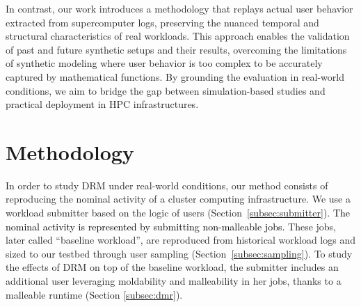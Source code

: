 \documentclass[a4paper,fleqn]{cas-dc}
\newcommand{\sergio}[1]{\textcolor{black}{#1}}
\begin{document}
In contrast, our work introduces a methodology that replays actual user behavior extracted from supercomputer logs, preserving the nuanced temporal and structural characteristics of real workloads. This approach enables the validation of past and future synthetic setups and their results, overcoming the limitations of synthetic modeling where user behavior is too complex to be accurately captured by mathematical functions. By grounding the evaluation in real-world conditions, we aim to bridge the gap between simulation-based studies and practical deployment in HPC infrastructures.



\section{Methodology}\label{sec:methodology}

In order to study DRM under real-world conditions,
our method consists of reproducing the nominal activity of a cluster computing infrastructure.
We use a workload submitter based on the logic of users (Section~\ref{subsec:submitter}).
\sergio{The nominal activity is represented by submitting non-malleable jobs.}
These jobs, later called ``baseline workload'', are reproduced from historical workload logs and sized to our testbed through user sampling (Section~\ref{subsec:sampling}).
To study the effects of DRM on top of the baseline workload, the submitter includes an additional user leveraging moldability and malleability in her jobs, thanks to a malleable runtime (Section \ref{subsec:dmr}).
\end{document}
